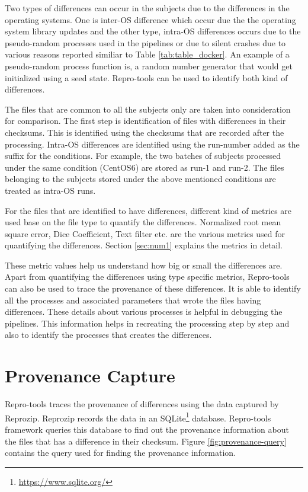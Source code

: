 Two types of differences can occur in the subjects due to the differences in the operating systems. One is inter-OS difference which occur due the the operating system library updates and the other type, intra-OS differences occurs due to the pseudo-random processes used in the pipelines or due to silent crashes due to various reasons reported similiar to Table \ref{tab:table_docker}. An example of a pseudo-random process function is, a random number generator that would get initialized using a seed state. Repro-tools can be used to identify both kind of differences.

The files that are common to all the subjects only are taken into consideration for comparison. The first step is identification of files with differences in their checksums. This is identified using the checksums that are recorded after the processing. Intra-OS differences are identified using the run-number added as the suffix for the conditions. For example, the two batches of subjects processed under the same condition (CentOS6) are stored as run-1 and run-2. The files belonging to the subjects stored under the above mentioned conditions are treated as intra-OS runs.

For the files that are identified to have differences, different kind of metrics are used base on the file type to quantify the differences. Normalized root mean square error, Dice Coefficient, Text filter etc. are the various metrics used for quantifying the differences. Section \ref{sec:num1} explains the metrics in detail. 

These metric values help us understand how big or small the differences are. Apart from quantifying the differences using type specific metrics, Repro-tools can also be used to trace the provenance of these differences. It is able to identify all the processes and associated parameters that wrote the files having differences. These details about various processes is helpful in debugging the pipelines. This information helps in recreating the processing step by step and also to identify the processes that creates the differences.


\section{Provenance Capture}
Repro-tools traces the provenance of differences using the data captured by Reprozip. Reprozip records the data in an SQLite\footnote{\url{https://www.sqlite.org/}} database. Repro-tools framework queries this database to find out the provenance information about the files that has a difference in their checksum. Figure \ref{fig:provenance-query} contains the query used for finding the provenance information.\\

